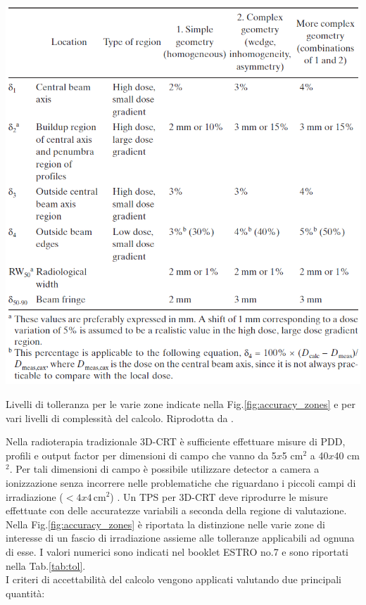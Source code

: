 \begin{table}
\centering
\includegraphics[width=\textwidth]{./cap2/accuracy_tol.png}
\caption{Livelli di tolleranza per le varie zone indicate nella Fig.\ref{fig:accuracy_zones} e per vari livelli di complessità del calcolo. Riprodotta da \cite{Mijnheer2004}.}
\label{tab:tol}
\end{table}
Nella radioterapia tradizionale 3D-CRT è sufficiente effettuare misure di PDD, profili e output factor per dimensioni di campo che vanno da 5$x$5 cm$^2$ a 40$x$40 cm$^2$. Per tali dimensioni di campo è possibile utilizzare detector a camera a ionizzazione senza incorrere nelle problematiche che riguardano i piccoli campi di irradiazione ($< 4x4\,$cm$^2$) \cite{Das2008}. Un TPS per 3D-CRT deve riprodurre le misure effettuate con delle accuratezze variabili a seconda della regione di valutazione. Nella Fig.\ref{fig:accuracy_zones} è riportata la distinzione  nelle varie zone di interesse di un fascio di irradiazione assieme alle tolleranze applicabili ad ognuna di esse. I valori numerici sono indicati nel booklet ESTRO no.7 e sono riportati nella Tab.\ref{tab:tol}.\\
I criteri di accettabilità del calcolo vengono applicati valutando due principali quantità:

